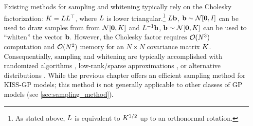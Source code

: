 Existing methods for sampling and whitening typically rely on the Cholesky factorization: $K = L L^\top$, where $L$ is lower triangular.\footnote{
  As stated above, $L$ is equivalent to $K^{1/2}$ up to an orthonormal rotation.
}
$L\mathbf{b}$, $\bb \sim \normaldist{\bzero}{\bI}$ can be used to draw samples from from $\normaldist{\bzero}{\bK}$ and $L^{-1} \mathbf{b}$, $\bb \sim \normaldist{\bzero}{\bK}$ can be used to ``whiten'' the vector $\mathbf{b}$.
However, the Cholesky factor requires $\bigo{N^3}$ computation and $\bigo{N^2}$ memory for an $N \times N$ covariance matrix $K$.
Consequentially, sampling and whitening are typically accomplished with randomized algorithms \citep[e.g.][]{rahimi2008random}, low-rank/sparse approximations \citep[e.g.][]{wilson2020efficiently}, or alternative distributions \citep[e.g.][]{wang2017max}.
While the previous chapter offers an efficient sampling method for KISS-GP models; this method is not generally applicable to other classes of GP models (see \cref{sec:sampling_method}).

